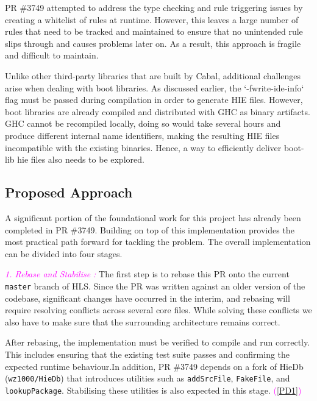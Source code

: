\documentclass[a4paper,12pt]{article}
\begin{document}
PR \#3749 attempted to address the type checking and rule triggering issues by creating a whitelist of rules at runtime. However, this leaves a large number of rules that need to be tracked and maintained to ensure that no unintended rule slips through and causes problems later on. As a result, this approach is fragile and difficult to maintain.

\vspace{0.6em}
Unlike other third-party libraries that are built by Cabal, additional challenges arise when dealing with boot libraries. As discussed earlier, the `-fwrite-ide-info` flag must be passed during compilation in order to generate HIE files. However, boot libraries are already compiled and distributed with GHC as binary artifacts. GHC cannot be recompiled locally, doing so would take several hours and produce different internal name identifiers, making the resulting HIE files incompatible with the existing binaries. Hence, a way to efficiently deliver boot-lib hie files also needs to be explored.

\subsection{Proposed Approach}
A significant portion of the foundational work for this project has already been completed in PR \#3749. Building on top of this implementation provides the most practical path forward for tackling the problem. The overall implementation can be divided into four stages.

\vspace{0.6em}
\textcolor{magenta}{\textit{1. Rebase and Stabilise :  }}
The first step is to rebase this PR onto the current \texttt{master} branch of HLS. Since the PR was written against an older version of the codebase, significant changes have occurred in the interim, and rebasing will require resolving conflicts across several core files. While solving these conflicts we also have to make sure that the surrounding architecture remains correct.

\vspace{0.6em}
After rebasing, the implementation must be verified to compile and run correctly. This includes ensuring that the existing test suite passes and confirming the expected runtime behaviour.In addition, PR \#3749 depends on a fork of HieDb (\texttt{wz1000/HieDb}) that introduces utilities such as \texttt{addSrcFile}, \texttt{FakeFile}, and \texttt{lookupPackage}. Stabilising these utilities is also expected in this stage. \textcolor{magenta}{(\ref{PD1})}
\vspace{0.6em}
\end{document}
